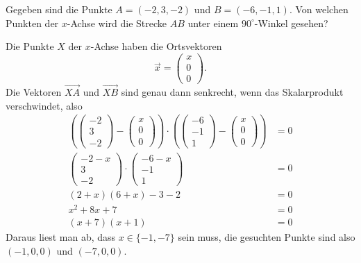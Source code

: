 Gegeben sind die Punkte $A=(-2,3,-2)$ und $B=(-6,-1,1)$. Von welchen Punkten
der $x$-Achse wird die Strecke $AB$ unter einem $90^\circ$-Winkel gesehen?


\begin{loesung}
Die Punkte $X$ der $x$-Achse haben die Ortsvektoren
\[
\vec x=\begin{pmatrix}x\\0\\0\end{pmatrix}
.
\]
Die Vektoren $\overset{\rightarrow}{XA}$ und $\overset{\rightarrow}{XB}$ sind
genau dann senkrecht, wenn das Skalarprodukt verschwindet, also
\begin{align*}
\left(
\begin{pmatrix}-2\\3\\-2\end{pmatrix}
-
\begin{pmatrix}x\\0\\0\end{pmatrix}
\right)\cdot\left(
\begin{pmatrix}-6\\-1\\1\end{pmatrix}
-
\begin{pmatrix}x\\0\\0\end{pmatrix}
\right)
&=0
\\
\begin{pmatrix}-2-x\\3\\-2\end{pmatrix}
\cdot
\begin{pmatrix}-6-x\\-1\\1\end{pmatrix}
&=0
\\
(2+x)(6+x)-3-2&=0\\
x^2+8x+7&=0\\
(x+7)(x+1)&=0
\end{align*}
Daraus liest man ab, dass $x\in\{-1,-7\}$ sein muss, die gesuchten Punkte
sind also $(-1,0,0)$ und $(-7,0,0)$.
\end{loesung}

